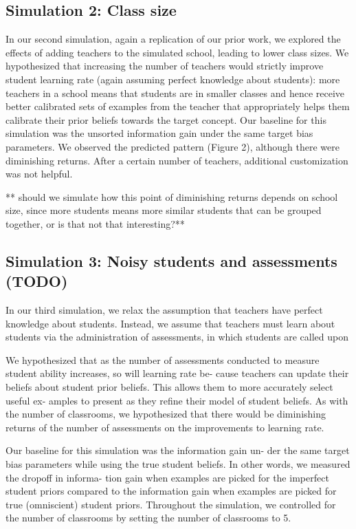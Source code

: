 \documentclass[10pt, letterpaper]{article}
\begin{document}
\subsection{Simulation 2: Class size}\label{simulation-2-class-size}

In our second simulation, again a replication of our prior work, we
explored the effects of adding teachers to the simulated school, leading
to lower class sizes. We hypothesized that increasing the number of
teachers would strictly improve student learning rate (again assuming
perfect knowledge about students): more teachers in a school means that
students are in smaller classes and hence receive better calibrated sets
of examples from the teacher that appropriately helps them calibrate
their prior beliefs towards the target concept. Our baseline for this
simulation was the unsorted information gain under the same target bias
parameters. We observed the predicted pattern (Figure 2), although there
were diminishing returns. After a certain number of teachers, additional
customization was not helpful.

** should we simulate how this point of diminishing returns depends on
school size, since more students means more similar students that can be
grouped together, or is that not that interesting?**

\subsection{Simulation 3: Noisy students and assessments
(TODO)}\label{simulation-3-noisy-students-and-assessments-todo}

In our third simulation, we relax the assumption that teachers have
perfect knowledge about students. Instead, we assume that teachers must
learn about students via the administration of assessments, in which
students are called upon

We hypothesized that as the number of assessments conducted to measure
student ability increases, so will learning rate be- cause teachers can
update their beliefs about student prior beliefs. This allows them to
more accurately select useful ex- amples to present as they refine their
model of student beliefs. As with the number of classrooms, we
hypothesized that there would be diminishing returns of the number of
assessments on the improvements to learning rate.

Our baseline for this simulation was the information gain un- der the
same target bias parameters while using the true student beliefs. In
other words, we measured the dropoff in informa- tion gain when examples
are picked for the imperfect student priors compared to the information
gain when examples are picked for true (omniscient) student priors.
Throughout the simulation, we controlled for the number of classrooms by
setting the number of classrooms to 5.
\end{document}
